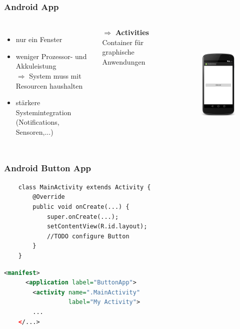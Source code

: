 \begin{frame}[c]
	\frametitle{Android App}
	\begin{columns}[t]
	\vspace{0.5cm}
	\begin{itemize}
	\item nur ein Fenster \pause \medskip
	\item weniger Prozessor- und Akkuleistung \pause \\
		$\Rightarrow$ System muss mit Resourcen haushalten \\ \medskip \pause 
	\item stärkere Systemintegration \\ (Notifications, Sensoren,...) \pause
	\end{itemize}
	\vspace{0.2cm}
	{\large $\Rightarrow$ \textbf{Activities}} \\
	\hspace{1cm}Container für graphische Anwendungen \pause

	\vspace{-1cm}
	\begin{figure}
	\includegraphics[height=6cm]{pictures/button-android-framed.png}
	\end{figure}
	\end{columns}
\end{frame}

\begin{frame}[c,fragile]
	\frametitle{Android Button App}
	\begin{lstlisting}
	class MainActivity extends Activity {
	    @Override
	    public void onCreate(...) {
	        super.onCreate(...);
	        setContentView(R.id.layout);
	        //TODO configure Button
	    }
	}
	\end{lstlisting}
	\pause \vspace{0.5cm}
	\begin{lstlisting}[language=XML]
	<manifest>
	  <application label="ButtonApp">
	    <activity name=".MainActivity" 
	              label="My Activity">
        ...
	</...>
	\end{lstlisting}
\end{frame}

